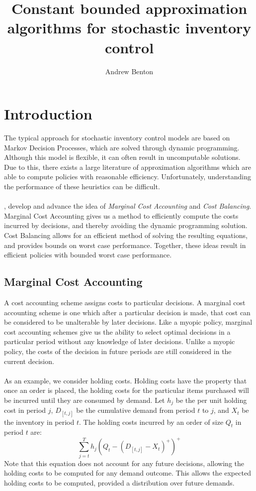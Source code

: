 \documentclass[12pt]{article}
\author{Andrew Benton}
\title{Constant bounded approximation algorithms for stochastic inventory control}
\begin{document}
\maketitle

\section{Introduction}

The typical approach for stochastic inventory control models are based on Markov Decision Processes, which are solved through dynamic programming. Although this model is flexible, it can often result in uncomputable solutions. Due to this, there exists a large literature of approximation algorithms which are able to compute policies with reasonable efficiency. Unfortunately, understanding the performance of these heuristics can be difficult.\\
\\ 
\cite{levi:2007}, \cite{levi:2008} develop and advance the idea of \textit{Marginal Cost Accounting} and \textit{Cost Balancing}. Marginal Cost Accounting gives us a method to efficiently compute the costs incurred by decisions, and thereby avoiding the dynamic programming solution. Cost Balancing allows for an efficient method of solving the resulting equations, and provides bounds on worst case performance. Together, these ideas result in efficient policies with bounded worst case performance. 


\subsection{Marginal Cost Accounting}

A cost accounting scheme assigns costs to particular decisions. A marginal cost accounting scheme is one which after a particular decision is made, that cost can be considered to be unalterable by later decisions. Like a myopic policy, marginal cost accounting schemes give us the ability to select optimal decisions in a particular period without any knowledge of later decisions. Unlike a myopic policy, the costs of the decision in future periods are still considered in the current decision. \\
\\
As an example, we consider holding costs. Holding costs have the property that once an order is placed, the holding costs for the particular items purchased will be incurred until they are consumed by demand. Let $h_j$ be the per unit holding cost in period $j$, $D_{[t,j]}$ be the cumulative demand from period $t$ to $j$, and $X_t$ be the inventory in period $t$. The holding costs incurred by an order of size $Q_t$ in period $t$ are:
$$
	\sum_{j=t}^T h_j (Q_t - (D_{[t,j]} - X_t)^+)^+
$$
Note that this equation does not account for any future decisions, allowing the holding costs to be computed for any demand outcome. This allows the expected holding costs to be computed, provided a distribution over future demands.
\end{document}
